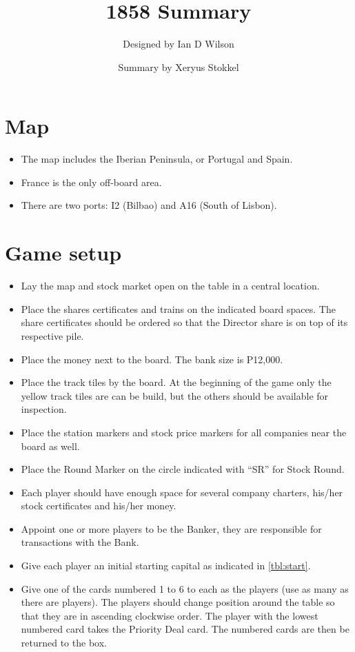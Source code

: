 \documentclass[a4paper]{article}
\title{1858 Summary}
\author{Designed by Ian D Wilson}
\date{Summary by Xeryus Stokkel}
\begin{document}
\maketitle

\section{Map}
\begin{itemize}
	\item The map includes the Iberian Peninsula, or Portugal and Spain.
	\item France is the only off-board area.
	\item There are two ports: I2 (Bilbao) and A16 (South of Lisbon).
\end{itemize}

\section{Game setup}
\begin{itemize}
	\item Lay the map and stock market open on the table in a central location.
	\item Place the shares certificates and trains on the indicated board
	spaces. The share certificates should be ordered so that the Director share
	is on top of its respective pile.
	\item Place the money next to the board. The bank size is P12,000.
	\item Place the track tiles by the board. At the beginning of the game only
	the yellow track tiles are can be build, but the others should be available
	for inspection.
	\item Place the station markers and stock price markers for all companies
	near the board as well.
	\item Place the Round Marker on the circle indicated with ``SR'' for Stock
	Round.
	\item Each player should have enough space for several company charters,
	his/her stock certificates and his/her money.
	\item Appoint one or more players to be the Banker, they are responsible for
	transactions with the Bank.
	\item Give each player an initial starting capital as indicated in
	\autoref{tbl:start}.
	\item Give one of the cards numbered 1 to 6 to each as the players (use as
	many as there are players). The players should change position around the
	table so that they are in ascending clockwise order. The player with the
	lowest numbered card takes the Priority Deal card. The numbered cards are
	then be returned to the box.
\end{itemize}
\end{document}
